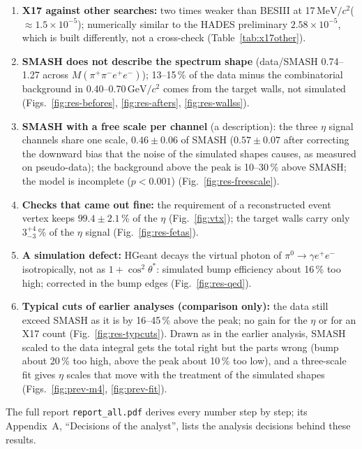 \documentclass[11pt,a4paper]{article}
\newcommand{\piz}{\ensuremath{\pi^{0}}\xspace}
\newcommand{\ee}{\ensuremath{e^{+}e^{-}}\xspace}
\newcommand{\Mfour}{\ensuremath{M(\pi^{+}\pi^{-}e^{+}e^{-})}\xspace}
\newcommand{\GeVcc}{\ensuremath{\mathrm{GeV}/c^{2}}\xspace}
\newcommand{\MeVcc}{\ensuremath{\mathrm{MeV}/c^{2}}\xspace}
\begin{document}
{\begin{enumerate}
\item \textbf{X17 against other searches:} two times weaker than BESIII at 17\,\MeVcc ($\approx1.5\times10^{-5}$); numerically similar
      to the HADES preliminary $2.58\times10^{-5}$, which is built differently, not a cross-check (Table~\ref{tab:x17other}).
\item \textbf{SMASH does not describe the spectrum shape} (data/SMASH 0.74--1.27 across \Mfour); 13--15\,\% of the data minus the combinatorial
      background in 0.40--0.70\,\GeVcc comes from the target walls, not simulated (Figs.~\ref{fig:res-befores}, \ref{fig:res-afters}, \ref{fig:res-wallss}).
\item \textbf{SMASH with a free scale per channel} (a description): the three $\eta$ signal channels share one scale, $0.46\pm0.06$ of SMASH
      ($0.57\pm0.07$ after correcting the downward bias that the noise of the simulated shapes causes, as measured on pseudo-data); the
      background above the peak is 10--30\,\% above SMASH; the model is incomplete ($p<0.001$) (Fig.~\ref{fig:res-freescale}).
\item \textbf{Checks that came out fine:} the requirement of a reconstructed event vertex keeps $99.4\pm2.1$\,\% of the $\eta$ (Fig.~\ref{fig:vtx}); the target walls
      carry only $3^{+4}_{-3}$\,\% of the $\eta$ signal (Fig.~\ref{fig:res-fetas}).
\item \textbf{A simulation defect:} HGeant decays the virtual photon of $\piz\to\gamma\ee$ isotropically, not as $1+\cos^2\theta^*$:
      simulated bump efficiency about 16\,\% too high; corrected in the bump edges (Fig.~\ref{fig:res-qed}).
\item \textbf{Typical cuts of earlier analyses (comparison only):} the data still exceed SMASH as it is by 16--45\,\% above the peak; no gain
      for the $\eta$ or for an X17 count (Fig.~\ref{fig:res-typcuts}). Drawn as in the earlier analysis, SMASH scaled to the data integral gets
      the total right but the parts wrong (bump about 20\,\% too high, above the peak about 10\,\% too low), and a three-scale fit gives $\eta$
      scales that move with the treatment of the simulated shapes (Figs.~\ref{fig:prev-m4}, \ref{fig:prev-fit}).
\end{enumerate}}

\smallskip
The full report \texttt{report\_all.pdf} derives every number step by step; its Appendix~A, ``Decisions of the analyst'', lists the analysis
decisions behind these results.
\end{document}
